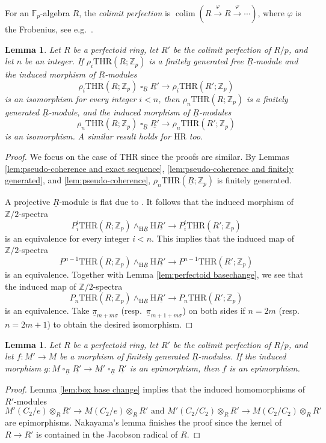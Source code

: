 \documentclass[10pt]{amsart}
\newtheorem{lem}[thm]{Lemma}
\theoremstyle{definition}
\numberwithin{equation}{section}
\newcommand{\F}{\mathbb{F}}
\newcommand{\Z}{\mathbb{Z}}
\newcommand{\rH}{\mathrm{H}}
\newcommand{\ul}{\underline}
\newcommand{\colim}{\mathop{\mathrm{colim}}}
\DeclareMathOperator{\sotimes}{\square}
\newcommand{\HR}{\mathrm{HR}}
\newcommand{\THR}{\mathrm{THR}}
\begin{document}
For an $\F_p$-algebra $R$,
the \emph{colimit perfection} is $\colim(R \xrightarrow{\varphi} R \xrightarrow{\varphi} \cdots)$,
where $\varphi$ is the Frobenius, see e.g.\ \cite[Remark 8.15]{BMS19}.
\begin{lem}
\label{lem:induction}
Let $R$ be a perfectoid ring,
let $R'$ be the colimit perfection of $R/p$,
and let $n$ be an integer.
If $\rho_i\THR(R;\Z_p)$ is a finitely generated free $\ul{R}$-module and the induced morphism of $\ul{R}$-modules 
\[
\rho_i\THR(R;\Z_p)
\sotimes_{\ul{R}}
\ul{R'}
\to
\rho_i\THR(R';\Z_p)
\]
is an isomorphism for every integer $i<n$,
then $\rho_n\THR(R;\Z_p)$ is a finitely generated $\ul{R}$-module,
and the induced morphism of $\ul{R}$-modules
\[
\rho_n\THR(R;\Z_p)
\sotimes_{\ul{R}}
\ul{R'}
\to
\rho_n\THR(R';\Z_p)
\]
is an isomorphism.
A similar result holds for $\HR$ too.
\end{lem}
\begin{proof}
We focus on the case of $\THR$ since the proofs are similar.
By Lemmas \ref{lem:pseudo-coherence and exact sequence},
\ref{lem:pseudo-coherence and finitely generated},
and \ref{lem:pseudo-coherence},
$\rho_n\THR(\ul{R};\Z_p)$ is finitely generated.

A projective $\ul{R}$-module is flat due to \cite[Proposition A.5.3]{HP23}.
It follows that the induced morphism of $\Z/2$-spectra
\[
P_i^i\THR(R;\Z_p)
\wedge_{\rH \ul{R}}
\rH \ul{R'}
\to
P_i^i\THR(R';\Z_p)
\]
is an equivalence for every integer $i<n$.
This implies that the induced map of $\Z/2$-spectra
\[
P^{n-1}\THR(R;\Z_p)
\wedge_{\rH \ul{R}}
\rH \ul{R'}
\to
P^{n-1}\THR(R';\Z_p)
\]
is an equivalence.
Together with Lemma \ref{lem:perfectoid basechange},
we see that the induced map of $\Z/2$-spectra
\[
P_n\THR(R;\Z_p)
\wedge_{\rH \ul{R}}
\rH \ul{R'}
\to
P_n\THR(R';\Z_p)
\]
is an equivalence.
Take $\ul{\pi}_{m+m\sigma}$ (resp.\ $\ul{\pi}_{m+1+m\sigma}$) on both sides if $n=2m$ (resp.\ $n=2m+1$) to obtain the desired isomorphism.
\end{proof}


\begin{lem}
\label{lem:Nakayama}
Let $R$ be a perfectoid ring,
let $R'$ be the colimit perfection of $R/p$,
and let $f\colon M'\to M$ be a morphism of finitely generated $\ul{R}$-modules.
If the induced morphism $g\colon M\sotimes_{\ul{R}}\ul{R'}
\to
M'\sotimes_{\ul{R}} \ul{R'}$ is an epimorphism,
then $f$ is an epimorphism.
\end{lem}
\begin{proof}
Lemma \ref{lem:box base change} implies that the induced homomorphisms of $R'$-modules
\[
M'(C_2/e)\otimes_R R'
\to
M(C_2/e)\otimes_R R'
\text{ and }
M'(C_2/C_2)\otimes_R R'
\to
M(C_2/C_2)\otimes_R R'
\]
are epimorphisms.
Nakayama's lemma finishes the proof since the kernel of $R\to R'$ is contained in the Jacobson radical of $R$.
\end{proof}
\end{document}
